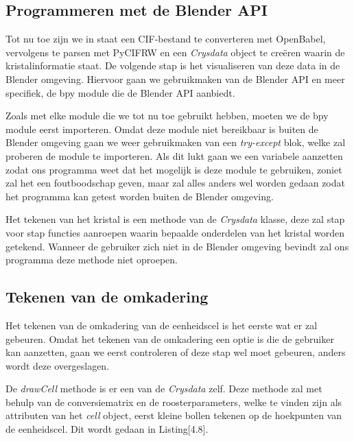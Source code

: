 \subsection{Programmeren met de Blender API}
Tot nu toe zijn we in staat een CIF-bestand te converteren met OpenBabel, vervolgens te parsen met PyCIFRW en een \textit{Crysdata} object te creëren waarin de kristalinformatie staat. De volgende stap is het visualiseren van deze data in de Blender omgeving. Hiervoor gaan we gebruikmaken van de Blender API en meer specifiek, de bpy module die de Blender API aanbiedt. 
\par
Zoals met elke module die we tot nu toe gebruikt hebben, moeten we de bpy module eerst importeren. Omdat deze module niet bereikbaar is buiten de Blender omgeving gaan we weer gebruikmaken van een \textit{try-except} blok, welke zal proberen de module te importeren. Als dit lukt gaan we een variabele aanzetten zodat ons programma weet dat het mogelijk is deze module te gebruiken, zoniet zal het een foutboodschap geven, maar zal alles anders wel worden gedaan zodat het programma kan getest worden buiten de Blender omgeving.
\par
Het tekenen van het kristal is een methode van de \textit{Crysdata} klasse, deze zal stap voor stap functies aanroepen waarin bepaalde onderdelen van het kristal worden getekend. Wanneer de gebruiker zich niet in de Blender omgeving bevindt zal ons programma deze methode niet oproepen. 

\subsection{Tekenen van de omkadering}

Het tekenen van de omkadering van de eenheidscel is het eerste wat er zal gebeuren. Omdat het tekenen van de omkadering een optie is die de gebruiker kan aanzetten, gaan we eerst controleren of deze stap wel moet gebeuren, anders wordt deze overgeslagen.
\par
De \textit{drawCell} methode is er een van de \textit{Crysdata} zelf. Deze methode zal met behulp van de conversiematrix en de roosterparameters, welke te vinden zijn als attributen van het \textit{cell} object, eerst kleine bollen tekenen op de hoekpunten van de eenheidscel. Dit wordt gedaan in Listing[4.8]. 




